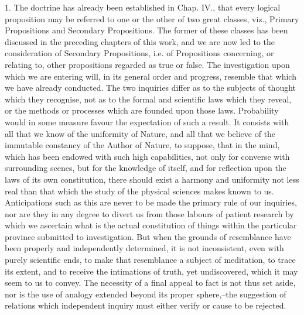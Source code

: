 \documentclass[oneside]{book}
\begin{document}
1. The doctrine has already been established in Chap. IV.,
that every logical proposition may be referred to one or
the other of two great classes, viz., Primary Propositions and
Secondary Propositions. The former of these classes has been
discussed in the preceding chapters of this work, and we are now
led to the consideration of Secondary Propositions, i.e. of Propositions
concerning, or relating to, other propositions regarded as
true or false. The investigation upon which we are entering will,
in its general order and progress, resemble that which we have already
conducted. The two inquiries differ as to the subjects of
thought which they recognise, not as to the formal and scientific
laws which they reveal, or the methods or processes which are
founded upon those laws. Probability would in some measure favour
the expectation of such a result. It consists with all that we
know of the uniformity of Nature, and all that we believe of the immutable
constancy of the Author of Nature, to suppose, that in the
mind, which has been endowed with such high capabilities, not
only for converse with surrounding scenes, but for the knowledge
of itself, and for reflection upon the laws of its own constitution,
there should exist a harmony and uniformity not less real than
that which the study of the physical sciences makes known to us.
Anticipations such as this are never to be made the primary rule
of our inquiries, nor are they in any degree to divert us from
those labours of patient research by which we ascertain what is
the actual constitution of things within the particular province
submitted to investigation. But when the grounds of resemblance
have been properly and independently determined, it is
not inconsistent, even with purely scientific ends, to make that
resemblance a subject of meditation, to trace its extent, and to
receive the intimations of truth, yet undiscovered, which it may
seem to us to convey. The necessity of a final appeal to fact is
not thus set aside, nor is the use of analogy extended beyond its
proper sphere,--the suggestion of relations which independent
inquiry must either verify or cause to be rejected.
\end{document}
